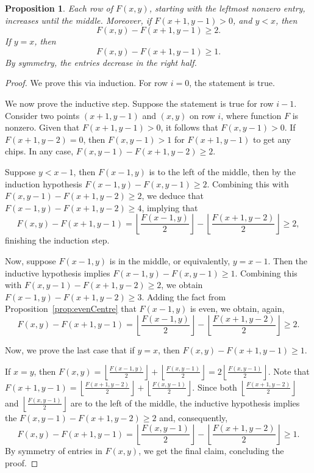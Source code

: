 \documentclass[11pt]{article}
\newtheorem{proposition}[theorem]{Proposition}
\theoremstyle{definition}
\theoremstyle{remark}
\newcommand{\floor}[1]{\left\lfloor #1 \right\rfloor}
\begin{document}
\begin{proposition}\label{prop:IncreaseUntilMiddle}
    Each row of $F(x,y)$, starting with the leftmost nonzero entry, increases until the middle. Moreover, if $F(x+1,y-1) > 0$, and $y < x$, then
    \begin{equation}F(x, y) - F(x+1, y-1) \ge 2.\end{equation}
    If $y = x$, then
    \begin{equation}F(x, y) - F(x+1, y-1) \ge 1.\end{equation}
    By symmetry, the entries decrease in the right half.
\end{proposition}
\begin{proof}
We prove this via induction. For row $i=0$, the statement is true.

We now prove the inductive step. Suppose the statement is true for row $i-1$. Consider two points $(x+1,y-1)$ and $(x,y)$ on row $i$, where function $F$ is nonzero. Given that $F(x+1,y-1) > 0$, it follows that $F(x, y-1) > 0$. If $F(x+1, y-2) = 0$, then $F(x, y-1) > 1$ for $F(x+1,y-1)$ to get any chips. In any case, $F(x, y-1) - F(x+1, y-2) \ge 2$.

Suppose $y < x-1$, then $F(x-1, y)$ is to the left of the middle, then by the induction hypothesis $ F(x-1, y) - F(x, y-1) \ge 2$. Combining this with $F(x, y-1) - F(x+1, y-2) \ge 2$, we deduce that $F(x-1, y) - F(x+1, y-2) \ge 4$, implying that
\[F(x, y) - F(x+1, y-1) = \floor{\frac{F(x-1, y)}{2}} - \floor{\frac{F(x+1, y-2)}{2}} \ge 2,\]
finishing the induction step.

Now, suppose $F(x-1, y)$ is in the middle, or equivalently, $y = x-1$. Then the inductive hypothesis implies $F(x-1, y)- F(x, y-1) \ge 1$. Combining this with $F(x, y-1) - F(x+1, y-2) \ge 2$, we obtain $F(x-1, y) - F(x+1, y-2) \ge 3$. Adding the fact from Proposition~\ref{prop:evenCentre} that $F(x-1, y)$ is even, we obtain, again, 
\[F(x, y) - F(x+1, y-1) = \floor{\frac{F(x-1, y)}{2}} - \floor{\frac{F(x+1, y-2)}{2}} \ge 2.\]

Now, we prove the last case that if $y = x$, then $F(x, y) - F(x+1, y-1) \ge 1$.

If $x=y$, then $F(x, y) = \floor{\frac{F(x-1, y)}{2}} + \floor{\frac{F(x, y-1)}{2}} = 2\floor{\frac{F(x, y-1)}{2}}$. Note that $F(x+1, y-1) = \floor{\frac{F(x+1, y-2)}{2}} + \floor{\frac{F(x, y-1)}{2}}$. Since both $\floor{\frac{F(x+1, y-2)}{2}}$ and $\floor{\frac{F(x, y-1)}{2}}$ are to the left of the middle, the inductive hypothesis implies the $F(x, y-1) - F(x+1, y-2) \ge 2$ and, consequently,
\[F(x ,y) - F(x+1, y-1) = \floor{\frac{F(x, y-1)}{2}} - \floor{\frac{F(x+1, y-2)}{2}} \ge 1.\]
By symmetry of entries in $F(x,y)$, we get the final claim, concluding the proof.
\end{proof}
\end{document}
